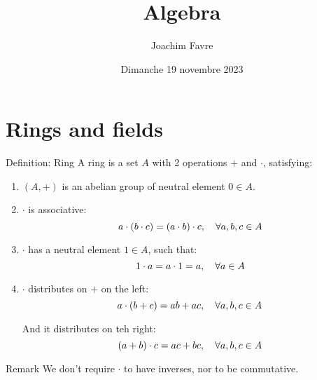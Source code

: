 \documentclass[a4paper]{article}
\title{Algebra}
\author{Joachim Favre}
\date{Dimanche 19 novembre 2023}
\begin{document}
\maketitle


\section{Rings and fields}

\begin{parag}{Definition: Ring}
    A ring is a set $A$ with 2 operations $+$ and $\cdot $, satisfying:
    \begin{enumerate}
        \item $\left(A, +\right)$ is an abelian group of neutral element $0 \in A$.
        \item $\cdot $ is associative: 
        \[a\cdot \left(b\cdot c\right) = \left(a\cdot b\right)\cdot c, \mathspace \forall a,b,c \in A\]
        \item $\cdot $ has a neutral element $1 \in A$, such that:
        \[1\cdot a = a\cdot 1 = a, \quad \forall a \in A\]
        \item $\cdot $ distributes on $+$ on the left: 
        \[a\cdot \left(b+c\right) =  ab + ac, \mathspace \forall a, b, c \in A\]

        And it distributes on teh right: 
        \[\left(a + b\right)\cdot c = ac + bc, \mathspace \forall a, b, c \in A\]
    \end{enumerate}
    
    \begin{subparag}{Remark}
        We don't require $\cdot $ to have inverses, nor to be commutative.
    \end{subparag}
\end{parag}
\end{document}
